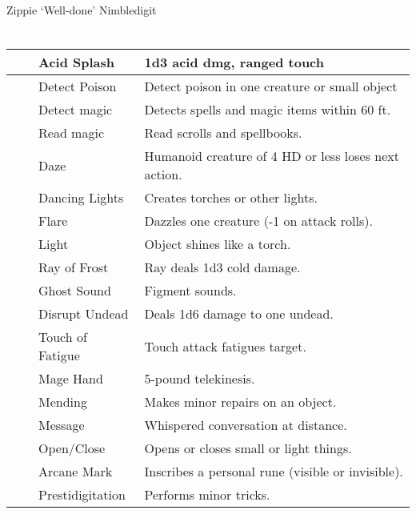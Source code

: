 \documentclass[12pt]{article}
\begin{document}
\vspace{2em}\vspace{-2em} \\
Zippie `Well-done' Nimbledigit

\section*{}
\normalfont
\begin{tabular}{|l|l|l|l|}
\hline
\hspace{0.5em} & \hspace{0.5em} & Acid Splash & 1d3 acid dmg, ranged touch \\
\hline
& & Detect Poison & Detect poison in one creature or small object \\
\hline
& & Detect magic &  Detects spells and magic items within 60 ft. \\
\hline
& & Read magic & Read scrolls and spellbooks. \\
\hline
& & Daze & Humanoid creature of 4 HD or less loses next action. \\
\hline
& & Dancing Lights& Creates torches or other lights.\\
\hline
& & Flare& Dazzles one creature (-1 on attack rolls).\\
\hline
& & Light& Object shines like a torch.\\
\hline
& &Ray of Frost& Ray deals 1d3 cold damage.\\
\hline
& &Ghost Sound& Figment sounds.\\
\hline
& &Disrupt Undead& Deals 1d6 damage to one undead. \\
\hline
& &Touch of Fatigue& Touch attack fatigues target.\\
\hline
& &Mage Hand& 5-pound telekinesis.\\
\hline
& &Mending& Makes minor repairs on an object.\\
\hline
& &Message& Whispered conversation at distance.\\
\hline
& &Open/Close& Opens or closes small or light things.\\
\hline
& & Arcane Mark & Inscribes a personal rune (visible or invisible). \\
\hline
& &Prestidigitation & Performs minor tricks.\\
\hline
\end{tabular}
\end{document}
